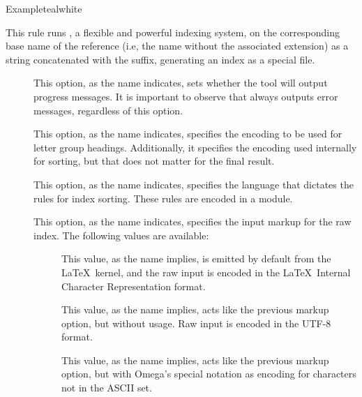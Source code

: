 \begin{description}
\begin{codebox}{Example}{teal}{\icnote}{white}
\end{codebox}

\item[\rulebox{xindy}]
This rule runs , a flexible and powerful indexing system, on the corresponding base name of the  reference (i.e, the name without the associated extension) as a string concatenated with the  suffix, generating an index as a special  file.

\begin{description}
\item[] This option, as the name indicates, sets whether the tool will output progress messages. It is important to observe that  always outputs error messages, regardless of this option.

\item[] This option, as the name indicates, specifies the encoding to be used for letter group headings. Additionally, it specifies the encoding used internally for sorting, but that does not matter for the final result.

\item[] This option, as the name indicates, specifies the language that dictates the rules for index sorting. These rules are encoded in a module.

\item[] This option, as the name indicates, specifies the input markup for the raw index. The following values are available:

\begin{description}
\item[] This value, as the name implies, is emitted by default from the \LaTeX\ kernel, and the raw input is encoded in the \LaTeX\ Internal Character Representation format.

\item[] This value, as the name implies, acts like the previous  markup option, but without  usage. Raw input is encoded in the UTF-8 format.

\item[] This value, as the name implies, acts like the previous  markup option, but with Omega's special notation as encoding for characters not in the ASCII set.


\end{description}
\end{description}
\end{description}
